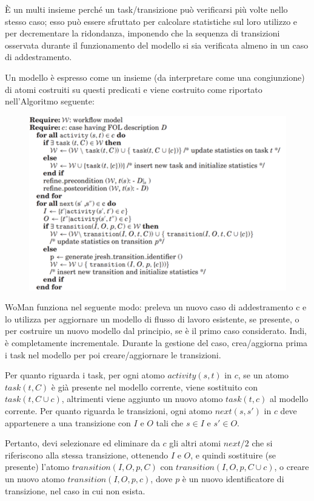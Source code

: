 È un multi insieme perché un task/transizione può verificarsi più volte nello stesso caso; esso può essere sfruttato per calcolare statistiche sul loro utilizzo e per decrementare la ridondanza, imponendo che la sequenza di transizioni osservata durante il funzionamento del modello si sia verificata almeno in un caso di addestramento. 

Un modello è espresso come un insieme (da interpretare come una congiunzione) di atomi costruiti su questi predicati e viene costruito come riportato nell'Algoritmo seguente:

\begin{figure}
    \begin{center}    
        \includegraphics[width=0.9\linewidth]{images/53.png}
    \end{center}
\end{figure}
 

WoMan funziona nel seguente modo: preleva un nuovo caso di addestramento c e lo utilizza per aggiornare un modello di flusso di lavoro esistente, se presente, o per costruire un nuovo modello dal principio, se è il primo caso considerato. Indi, è completamente incrementale. Durante la gestione del caso, crea/aggiorna prima i task nel modello per poi creare/aggiornare le transizioni. 

Per quanto riguarda i task, per ogni atomo $activity(s, t)$ in $c$, se un atomo $task(t, C)$ è già presente nel modello corrente, viene sostituito con $task(t, C \cup {c})$, altrimenti viene aggiunto un nuovo atomo $task(t, {c})$ al modello corrente. Per quanto riguarda le transizioni, ogni atomo $next(s, s')$ in $c$ deve appartenere a una transizione con $I$ e $O$ tali che $s \in I$ e $s' \in O$.

Pertanto, devi selezionare ed eliminare da $c$ gli altri atomi $next/2$ che si riferiscono alla stessa transizione, ottenendo $I$ e $O$, e quindi sostituire (se presente) l'atomo $transition(I, O, p, C)$ con $transition(I, O, p, C \cup {c})$, o creare un nuovo atomo $transition(I, O, p, {c})$, dove $p$ è un nuovo identificatore di transizione, nel caso in cui non esista.

